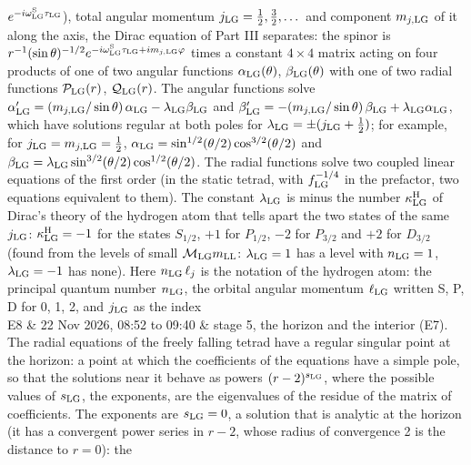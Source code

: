 \documentclass[
  10pt,
]{article}
\begin{document}
\begin{longtable}[]
\(e^{-i\omega^{\rm S}_{\rm LG}\tau_{\rm LG}}\)), total angular momentum
\(j_{\rm LG}=\tfrac12,\tfrac32,\dots\) and component \(m_{j,{\rm LG}}\)
of it along the axis, the Dirac equation of Part III separates: the
spinor is
\(r^{-1}(\sin\theta)^{-1/2}e^{-i\omega^{\rm S}_{\rm LG}\tau_{\rm LG}+im_{j,{\rm LG}}\varphi}\)
times a constant \(4\times4\) matrix acting on four products of one of
two angular functions \(\alpha_{\rm LG}(\theta)\),
\(\beta_{\rm LG}(\theta)\) with one of two radial functions
\(\mathcal P_{\rm LG}(r)\), \(\mathcal Q_{\rm LG}(r)\). The angular
functions solve
\(\alpha_{\rm LG}'=(m_{j,{\rm LG}}/\sin\theta)\,\alpha_{\rm LG}-\lambda_{\rm LG}\beta_{\rm LG}\)
and
\(\beta_{\rm LG}'=-(m_{j,{\rm LG}}/\sin\theta)\,\beta_{\rm LG}+\lambda_{\rm LG}\alpha_{\rm LG}\),
which have solutions regular at both poles for
\(\lambda_{\rm LG}=\pm(j_{\rm LG}+\tfrac12)\); for example, for
\(j_{\rm LG}=m_{j,{\rm LG}}=\tfrac12\),
\(\alpha_{\rm LG}=\sin^{1/2}(\theta/2)\cos^{3/2}(\theta/2)\) and
\(\beta_{\rm LG}=\lambda_{\rm LG}\sin^{3/2}(\theta/2)\cos^{1/2}(\theta/2)\).
The radial functions solve two coupled linear equations of the first
order (in the static tetrad, with \(f_{\rm LG}^{-1/4}\) in the
prefactor, two equations equivalent to them). The constant
\(\lambda_{\rm LG}\) is minus the number \(\kappa^{\rm H}_{\rm LG}\) of
Dirac's theory of the hydrogen atom that tells apart the two states of
the same \(j_{\rm LG}\): \(\kappa^{\rm H}_{\rm LG}=-1\) for the states
\(S_{1/2}\), \(+1\) for \(P_{1/2}\), \(-2\) for \(P_{3/2}\) and \(+2\)
for \(D_{3/2}\) (found from the levels of small
\(\mathcal M_{\rm LG}m_{\rm LL}\): \(\lambda_{\rm LG}=1\) has a level
with \(n_{\rm LG}=1\), \(\lambda_{\rm LG}=-1\) has none). Here
\(n_{\rm LG}\,\ell_{j}\) is the notation of the hydrogen atom: the
principal quantum number \(n_{\rm LG}\), the orbital angular momentum
\(\ell_{\rm LG}\) written S, P, D for 0, 1, 2, and \(j_{\rm LG}\) as the
index \\
E8 & 22 Nov 2026, 08:52 to 09:40 & stage 5, the horizon and the interior
(E7). The radial equations of the freely falling tetrad have a regular
singular point at the horizon: a point at which the coefficients of the
equations have a simple pole, so that the solutions near it behave as
powers \((r-2)^{s_{\rm LG}}\), where the possible values of
\(s_{\rm LG}\), the exponents, are the eigenvalues of the residue of the
matrix of coefficients. The exponents are \(s_{\rm LG}=0\), a solution
that is analytic at the horizon (it has a convergent power series in
\(r-2\), whose radius of convergence 2 is the distance to \(r=0\)): the

\end{longtable}
\end{document}
